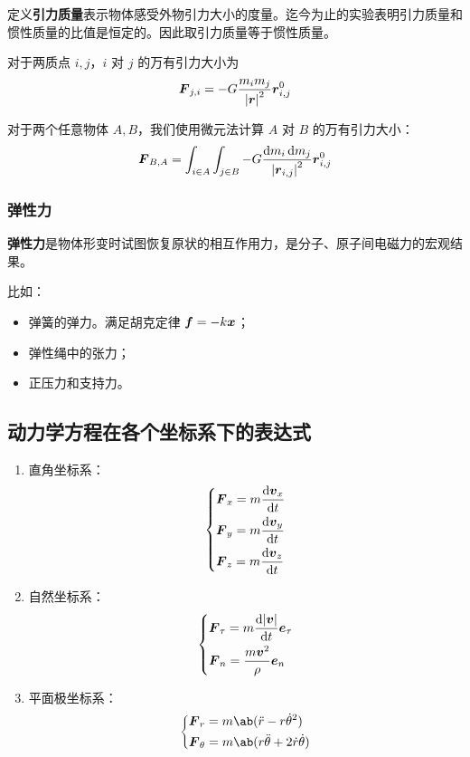 定义\textbf{引力质量}表示物体感受外物引力大小的度量。迄今为止的实验表明引力质量和惯性质量的比值是恒定的。因此取引力质量等于惯性质量。

对于两质点 $i, j$，$i$ 对 $j$ 的万有引力大小为
$$
\boldsymbol{F}_{j, i} = -G \frac{m_i m_j}{\abs{\boldsymbol{r}}^2} \boldsymbol{r}_{i, j}^0
$$

对于两个任意物体 $A, B$，我们使用微元法计算 $A$ 对 $B$ 的万有引力大小：
$$
\boldsymbol{F}_{B, A} = \int_{i \in A} \int_{j \in B} -G \frac{\dd{m_i} \dd{m_j}}{\abs{\boldsymbol{r}_{i, j}}^2} \boldsymbol{r}_{i, j}^0
$$

\subsubsection{弹性力}

\textbf{弹性力}是物体形变时试图恢复原状的相互作用力，是分子、原子间电磁力的宏观结果。

比如：
\begin{itemize}
    \item 弹簧的弹力。满足胡克定律 $\boldsymbol{f} = -k \boldsymbol{x}$；
    \item 弹性绳中的张力；
    \item 正压力和支持力。
\end{itemize}

\subsection{动力学方程在各个坐标系下的表达式}

\begin{enumerate}
    \item 直角坐标系：
    $$
    \begin{dcases}
        \boldsymbol{F}_x = m \dv{\boldsymbol{v}_x}{t} \\
        \boldsymbol{F}_y = m \dv{\boldsymbol{v}_y}{t} \\
        \boldsymbol{F}_z = m \dv{\boldsymbol{v}_z}{t}
    \end{dcases}
    $$
    \item 自然坐标系：
    $$
    \begin{dcases}
        \boldsymbol{F}_{\tau} = m \dv{|\boldsymbol{v}|}{t} \boldsymbol{e}_{\tau} \\
        \boldsymbol{F}_n = \frac{m \boldsymbol{v}^2}{\rho} \boldsymbol{e}_n
    \end{dcases}
    $$
    \item 平面极坐标系：
    $$
    \begin{dcases}
        \vect{F}_r = m \ab(\ddot{r} - r \dot{\theta}^2) \\
        \vect{F}_{\theta} = m \ab(r \ddot{\theta} + 2 \dot{r} \dot{\theta})
    \end{dcases}
    $$
\end{enumerate}

